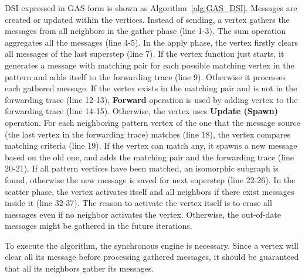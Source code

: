 DSI expressed in GAS form is shown as Algorithm~\vref{alg:GAS_DSI}. Messages are created or updated within the vertices. Instead of sending, a vertex gathers the messages from all neighbors in the gather phase (line 1-3). The sum operation aggregates all the messages (line 4-5). In the apply phase, the vertex firstly clears all messages of the last superstep (line 7). If the vertex function just starts, it generates a message with matching pair for each possible matching vertex in the pattern and adds itself to the forwarding trace (line 9). Otherwise it processes each gathered message. If the vertex exists in the matching pair and is not in the forwarding trace (line 12-13), \textbf{Forward} operation is used by adding vertex to the forwarding trace (line 14-15). Otherwise, the vertex uses \textbf{Update (Spawn)} operation. For each neighboring pattern vertex of the one that the message source (the last vertex in the forwarding trace) matches (line 18), the vertex compares matching criteria (line 19). If the vertex can match any, it spawns a new message based on the old one, and adds the matching pair and the forwarding trace (line 20-21). If all pattern vertices have been matched, an isomorphic subgraph is found, otherwise the new message is saved for next superstep (line 22-26). In the scatter phase, the vertex activates itself and all neighbors if there exist messages inside it (line 32-37). The reason to activate the vertex itself is to erase all messages even if no neighbor activates the vertex. Otherwise, the out-of-date messages might be gathered in the future iterations.

To execute the algorithm, the synchronous engine is necessary. Since a vertex will clear all its message before processing gathered messages, it should be guaranteed that all its neighbors gather its messages.


